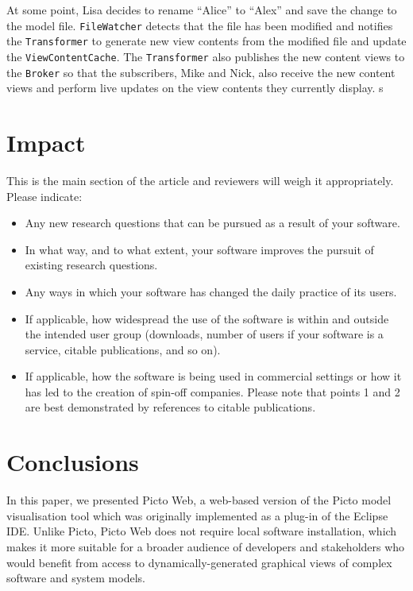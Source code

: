 \documentclass[preprint,12pt, a4paper]{elsarticle}
\begin{document}
At some point, Lisa decides to rename ``Alice'' to ``Alex'' and save the change to the model file. \texttt{File\-Watcher} detects that the file has been modified and notifies the \texttt{Transformer} to generate new view contents from the modified file and update the \texttt{View\-Content\-Cache}. The \texttt{Transformer} also publishes the new content views to the \texttt{Broker} so that the subscribers, Mike and Nick, also receive the new content views and perform live updates on the view contents they currently display.
s
\section{Impact}

This is the main section of the article and reviewers will weigh it
appropriately. Please indicate:

\begin{itemize}
  \item Any new research questions that can be pursued as a result of your
      software.

  \item In what way, and to what extent, your software improves the pursuit
      of existing research questions.

  \item Any ways in which your software has changed the daily practice of
      its users.

  \item If applicable, how widespread the use of the software is within and
      outside the intended user group (downloads, number of users if your
      software is a service, citable publications, and so on).

  \item If applicable, how the software is being used in commercial
      settings or how it has led to the creation of spin-off companies.
      Please note that points 1 and 2 are best demonstrated by references
      to citable publications. \end{itemize}

\section{Conclusions}
In this paper, we presented Picto Web, a web-based version of the Picto model visualisation tool which was originally implemented as a plug-in of the Eclipse IDE. Unlike Picto, Picto Web does not require local software installation, which makes it more suitable for a broader audience of developers and stakeholders who would benefit from access to dynamically-generated graphical views of complex software and system models. 
\end{document}
